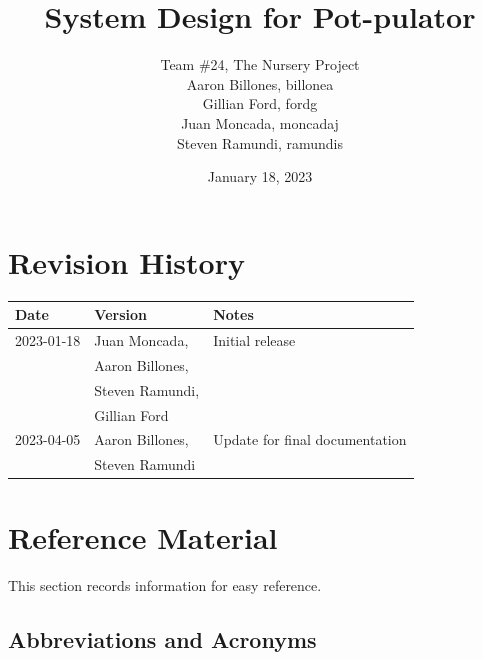 \documentclass[12pt, titlepage]{article}
\begin{document}
\title{System Design for Pot-pulator} 
\author{Team \#24, The Nursery Project\\Aaron Billones, billonea\\Gillian Ford, fordg\\Juan Moncada, moncadaj\\Steven Ramundi, ramundis}
\date{January 18, 2023}

\maketitle


\section{Revision History}

\begin{tabularx}{\textwidth}{p{3cm}p{4cm}X}
  \toprule {\bf Date} & {\bf Version} & {\bf Notes}\\
  \midrule
  2023-01-18 & Juan Moncada,& Initial release\\&Aaron Billones,\\&Steven Ramundi,\\&Gillian Ford \\
  2023-04-05 & Aaron Billones, &Update for final documentation\\ &Steven Ramundi\\
  \bottomrule
  \end{tabularx}

\newpage

\section{Reference Material}

This section records information for easy reference.

\subsection{Abbreviations and Acronyms}
\end{document}
